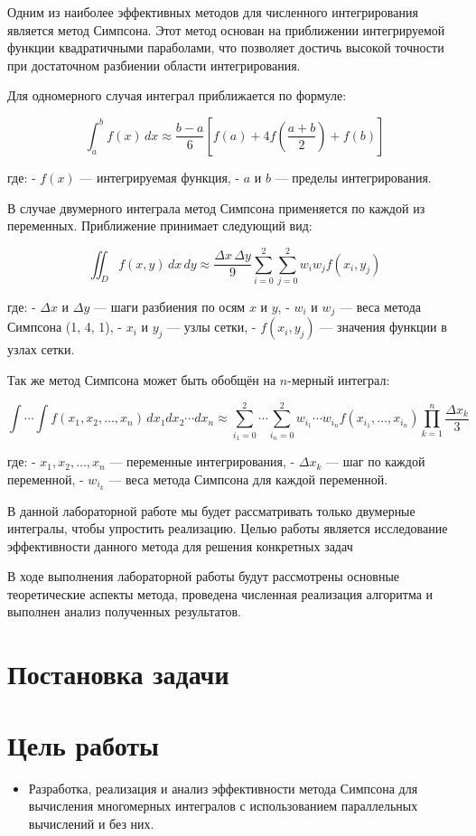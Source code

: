 \documentclass[12pt,a4paper]{article}
\begin{document}
Одним из наиболее эффективных методов для численного интегрирования является метод Симпсона. Этот метод основан на приближении интегрируемой функции квадратичными параболами, что позволяет достичь высокой точности при достаточном разбиении области интегрирования.

Для одномерного случая интеграл приближается по формуле:

\[
\int_a^b f(x) \, dx \approx \frac{b-a}{6} \left[f(a) + 4 f\left(\frac{a+b}{2}\right) + f(b)\right]
\]

где:  
- \( f(x) \) — интегрируемая функция,  
- \( a \) и \( b \) — пределы интегрирования.  

В случае двумерного интеграла метод Симпсона применяется по каждой из переменных. Приближение принимает следующий вид:

\[
\iint_D f(x, y) \, dx \, dy \approx \frac{\Delta x \, \Delta y}{9} \sum_{i=0}^{2} \sum_{j=0}^{2} w_i w_j f(x_i, y_j)
\]

где:  
- \( \Delta x \) и \( \Delta y \) — шаги разбиения по осям \( x \) и \( y \),  
- \( w_i \) и \( w_j \) — веса метода Симпсона (1, 4, 1),  
- \( x_i \) и \( y_j \) — узлы сетки,  
- \( f(x_i, y_j) \) — значения функции в узлах сетки.  

Так же метод Симпсона может быть обобщён на \( n \)-мерный интеграл:

\[
\int \cdots \int f(x_1, x_2, \ldots, x_n) \, dx_1 dx_2 \cdots dx_n \approx \sum_{i_1=0}^{2} \cdots \sum_{i_n=0}^{2} w_{i_1} \cdots w_{i_n} f(x_{i_1}, \ldots, x_{i_n}) \prod_{k=1}^{n} \frac{\Delta x_k}{3}
\]

где:  
- \( x_1, x_2, \ldots, x_n \) — переменные интегрирования,  
- \( \Delta x_k \) — шаг по каждой переменной,  
- \( w_{i_k} \) — веса метода Симпсона для каждой переменной.

В данной лабораторной работе мы будет рассматривать только двумерные интегралы, чтобы упростить реализацию. Целью работы является исследование эффективности данного метода для решения конкретных задач

В ходе выполнения лабораторной работы будут рассмотрены основные теоретические аспекты метода, проведена численная реализация алгоритма и выполнен анализ полученных результатов.

\section*{Постановка задачи}

\section*{Цель работы}
\begin{itemize}
    \item Разработка, реализация и анализ эффективности метода Симпсона для вычисления многомерных интегралов с использованием параллельных вычислений и без них.
\end{itemize}
\end{document}
